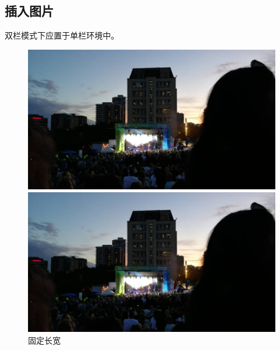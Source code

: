\documentclass[UTF8,12pt,a4paper]{article}
\begin{document}
\subsection{插入图片}

双栏模式下应置于单栏环境中。

\begin{figure}[!h]
	\centering
	\begin{minipage}[c]{0.45\textwidth}
		\centering
		\includegraphics[width=\linewidth, height=0.4\textheight]{city}
	\end{minipage}
	\quad
	\begin{minipage}[c]{0.45\textwidth}
		\centering
		\includegraphics[width=\linewidth, height=0.4\textheight]{city}
	\end{minipage}
	\caption{固定长宽}
\end{figure}
\end{document}

